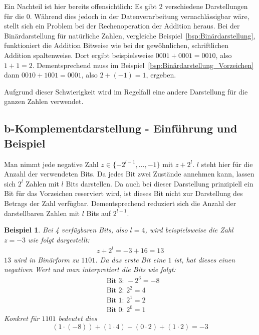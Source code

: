 \documentclass{article}
\newtheorem{beispiel}[satz]{Beispiel}
\begin{document}
  Ein Nachteil ist hier bereits offensichtlich: Es gibt 2 verschiedene Darstellungen für die $0$.
  Während dies jedoch in der Datenverarbeitung vernachlässigbar wäre, stellt sich ein Problem bei der Rechenoperation der Addition heraus.
  Bei der Binärdarstellung für natürliche Zahlen, vergleiche Beispiel~\ref{bsp:Binärdarstellung}, funktioniert die Addition Bitweise wie bei der gewöhnlichen, schriftlichen Addition spaltenweise.
  Dort ergibt beispielsweise $0001 + 0001 = 0010$, also $1+1=2$. 
  Dementsprechend muss im Beispiel~\ref{bsp:Binärdarstellung_Vorzeichen} dann $0010+1001=0001$, also $2+(-1)=1$, ergeben.

  Aufgrund dieser Schwierigkeit wird im Regelfall eine andere Darstellung für die ganzen Zahlen verwendet.

  \subsection{b-Komplementdarstellung - Einführung und Beispiel}

    Man nimmt jede negative Zahl $z\in \{-2^{l-1},\dots,-1\}$ mit $z+2^l$.
    $l$ steht hier für die Anzahl der verwendeten Bits. 
    Da jedes Bit zwei Zustände annehmen kann, lassen sich $2^l$ Zahlen mit $l$ Bits darstellen.
    Da auch bei dieser Darstellung prinzipiell ein Bit für das Vorzeichen reserviert wird, ist dieses Bit nicht zur Darstellung des Betrags der Zahl verfügbar.
    Dementsprechend reduziert sich die Anzahl der darstellbaren Zahlen mit $l$ Bits auf $2^{l-1}$.

    \begin{beispiel} \label{bsp:Komplementdarstellung_Erklärung}
      Bei 4 verfügbaren Bits, also $l=4$, wird beispielsweise die Zahl $z=-3$ wie folgt dargestellt:
      \begin{align*}
        z+2^l = -3+16 = 13
      \end{align*}
      $13$ wird in Binärform zu $1101$.
      Da das erste Bit eine $1$ ist, hat dieses einen negativen Wert und man interpretiert die Bits wie folgt:
      \begin{align*}
        &\text{Bit 3: } -2^3 = -8 \\
        &\text{Bit 2: } 2^2 = 4 \\
        &\text{Bit 1: } 2^1 = 2 \\
        &\text{Bit 0: } 2^0 = 1
      \end{align*}
      Konkret für $1101$ bedeutet dies
      \begin{equation*}
        (1 \cdot (-8)) + (1 \cdot 4) + (0 \cdot 2) + (1 \cdot 2) = -3
      \end{equation*}
    \end{beispiel}
\end{document}
